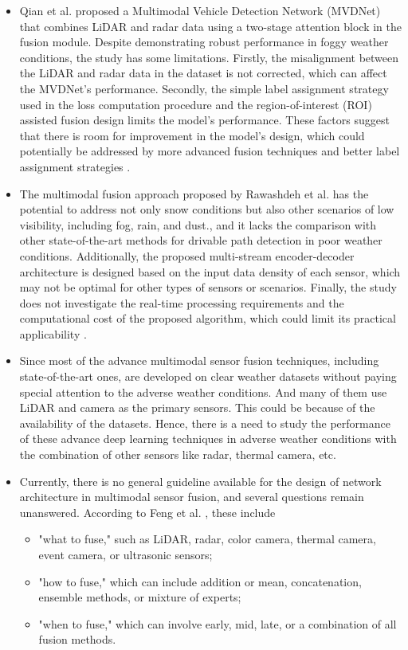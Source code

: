 \documentclass[rnd]{mas_proposal}
\begin{document}
\begin{itemize}
      \item Qian et al. \cite{qian2021robust} proposed a Multimodal Vehicle Detection Network (MVDNet) that combines LiDAR and radar data using a two-stage attention block in the fusion module. Despite demonstrating robust performance in foggy weather conditions, the study has some limitations. Firstly, the misalignment between the LiDAR and radar data in the dataset is not corrected, which can affect the MVDNet's performance. Secondly, the simple label assignment strategy used in the loss computation procedure and the region-of-interest (ROI) assisted fusion design limits the model's performance. These factors suggest that there is room for improvement in the model's design, which could potentially be addressed by more advanced fusion techniques and better label assignment strategies \cite{yang2022ralibev}.
      \newpage
      \item The multimodal fusion approach proposed by Rawashdeh et al. \cite{rawashdeh2021drivable} has the potential to address not only snow conditions but also other scenarios of low visibility, including fog, rain, and dust., and it lacks the comparison with other state-of-the-art methods for drivable path detection in poor weather conditions. Additionally, the proposed multi-stream encoder-decoder architecture is designed based on the input data density of each sensor, which may not be optimal for other types of sensors or scenarios. Finally, the study does not investigate the real-time processing requirements and the computational cost of the proposed algorithm, which could limit its practical applicability \cite{rawashdeh2021drivable}.

      \item Since most of the advance multimodal sensor fusion techniques, including state-of-the-art ones, are developed on clear weather datasets without paying special attention to the adverse weather conditions. And many of them use LiDAR and camera \cite{feng2020deep} as the primary sensors. This could be because of the availability of the datasets. Hence, there is a need to study the performance of these advance deep learning techniques in adverse weather conditions with the combination of other sensors like radar, thermal camera, etc.
    
      \item Currently, there is no general guideline available for the design of network architecture in multimodal sensor fusion, and several questions remain unanswered. According to Feng et al. \cite{feng2020deep}, these include 
      \begin{itemize}
            \item "what to fuse," such as LiDAR, radar, color camera, thermal camera, event camera, or ultrasonic sensors; 
            \item "how to fuse," which can include addition or mean, concatenation, ensemble methods, or mixture of experts; 
            \item "when to fuse," which can involve early, mid, late, or a combination of all fusion methods.
      \end{itemize}


\end{itemize}
\end{document}
